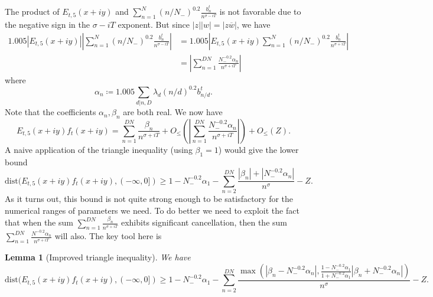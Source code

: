 \documentclass[a4paper,11pt,twoside]{amsart}
\newtheorem{lemma}[theorem]{Lemma}
\begin{document}
The product of $E_{t,5}(x+iy)$ and $\sum_{n=1}^N (n/N_-)^{0.2} \frac{b_n^t}{n^{\sigma-iT}}$ is not favorable due to the negative sign in the $\sigma-iT$ exponent.  But since $|z| |w| = |z \overline{w}|$, we have
\begin{align*}
1.005 |E_{t,5}(x+iy)| \left|\sum_{n=1}^N (n/N_-)^{0.2} \frac{b_n^t}{n^{\sigma-iT}}\right|  &=
1.005 \left|E_{t,5}(x+iy) \sum_{n=1}^N (n/N_-)^{0.2} \frac{b_n^t}{n^{\sigma+iT}}\right|  \\
&= \left|\sum_{n=1}^{DN} \frac{N_-^{-0.2} \alpha_{n}}{n^{\sigma+iT}}\right|
\end{align*}
where
$$ \alpha_{n} \coloneqq 1.005 \sum_{d|n,D} \lambda_d (n/d)^{0.2} b_{n/d}^t.$$
Note that the coefficients $\alpha_{n}, \beta_n$ are both real.  We now have
\begin{equation}\label{ets}
 E_{t,5}(x+iy) f_t(x+iy) = \sum_{n=1}^{DN} \frac{\beta_n}{n^{\sigma+iT}} + O_{\leq}\left( \left|\sum_{n=1}^{DN} \frac{N_-^{-0.2} \alpha_{n}}{n^{\sigma+iT}}\right| \right) + O_{\leq}(Z).
\end{equation}
A naive application of the triangle inequality (using $\beta_1=1$) would give the lower bound
\begin{equation}\label{eft}
 \mathrm{dist}(E_{t,5}(x+iy) f_t(x+iy), (-\infty,0]) \geq 1 - N_-^{-0.2} \alpha_{1} - \sum_{n=2}^{DN} \frac{|\beta_n| + |N_-^{-0.2} \alpha_{n}|}{n^{\sigma}} - Z.
\end{equation}
As it turns out, this bound is not quite strong enough to be satisfactory for the numerical ranges of parameters we need.  To do better we need to exploit the fact that when the sum $\sum_{n=1}^{DN} \frac{\beta_n}{n^{\sigma+iT}}$ exhibits significant cancellation, then the sum $\sum_{n=1}^{DN} \frac{N^{-0.2} \alpha_{n}}{n^{\sigma+iT}}$ will also. The key tool here is

\begin{lemma}[Improved triangle inequality]  We have
$$ \mathrm{dist}(E_{t,5}(x+iy) f_t(x+iy), (-\infty,0]) \geq 1 - N_-^{-0.2} \alpha_{1} - \sum_{n=2}^{DN} \frac{\max(|\beta_n-N_-^{-0.2} \alpha_{n}|, \frac{1-N_-^{-0.2} \alpha_{1}}{1+N_-^{-0.2} \alpha_{1}} |\beta_n+N_-^{-0.2} \alpha_{n}|)}{n^{\sigma}} - Z.$$
\end{lemma}
\end{document}
